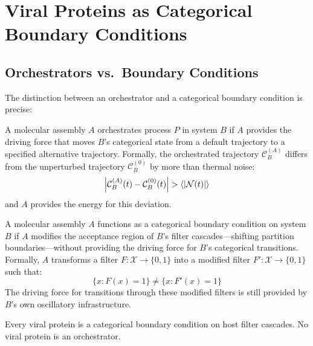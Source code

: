 \section{Viral Proteins as Categorical Boundary Conditions}
\label{v:sec:boundary}

\subsection{Orchestrators vs.\ Boundary Conditions}

The distinction between an orchestrator and a categorical boundary condition is precise:

\begin{definition}[Orchestrator]
\label{v:def:orchestrator}
A molecular assembly $A$ orchestrates process $P$ in system $B$ if $A$ provides the driving force that moves $B$'s categorical state from a default trajectory to a specified alternative trajectory. Formally, the orchestrated trajectory $\mathcal{C}_B^{(A)}$ differs from the unperturbed trajectory $\mathcal{C}_B^{(0)}$ by more than thermal noise:
\begin{equation}
  \abs{\mathcal{C}_B^{(A)}(t) - \mathcal{C}_B^{(0)}(t)} > \left\langle \abs{\mathcal{N}(t)} \right\rangle
\end{equation}
and $A$ provides the energy for this deviation.
\end{definition}

\begin{definition}
\label{v:def:BC}
A molecular assembly $A$ functions as a categorical boundary condition on system $B$ if $A$ modifies the acceptance region of $B$'s filter cascades---shifting partition boundaries---without providing the driving force for $B$'s categorical transitions. Formally, $A$ transforms a filter $F: \mathcal{X} \to \{0, 1\}$ into a modified filter $F': \mathcal{X} \to \{0, 1\}$ such that:
\begin{equation}
  \{x : F(x) = 1\} \neq \{x : F'(x) = 1\}
\end{equation}
The driving force for transitions through these modified filters is still provided by $B$'s own oscillatory infrastructure.
\end{definition}

\begin{theorem}
\label{v:thm:viral_protein_class}
Every viral protein is a categorical boundary condition on host filter cascades. No viral protein is an orchestrator.
\end{theorem}

